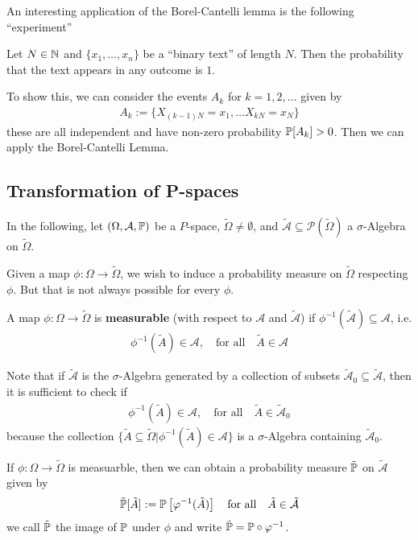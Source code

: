 An interesting application of the Borel-Cantelli lemma is the following ``experiment''
\begin{ex}[]
Let $N \in \mathbb{N}$ and $\{x_1,\ldots,x_n\}$ be a ``binary text'' of length $N$. Then the probability that the text appears in any outcome is $1$.

To show this, we can consider the events $A_k$ for $k = 1, 2, \ldots$ given by
\begin{align*}
  A_k := \{X_{(k-1)N} = x_1, \ldots X_{kN} = x_N\}
\end{align*}
these are all independent and have non-zero probability $\mathbb{P}[A_k] > 0$. 
Then we can apply the Borel-Cantelli Lemma.
\end{ex}

\subsection{Transformation of P-spaces}
In the following, let $(\Omega,\mathcal{A},\mathbb{P})$ be a $P$-space, $\tilde{\Omega} \neq \emptyset$, and $\tilde{\mathcal{A}} \subseteq \mathcal{P}(\tilde{\Omega})$ a $\sigma$-Algebra on $\tilde{\Omega}$.

Given a map $\phi: \Omega \to \tilde{\Omega}$, we wish to induce a probability measure on $\tilde{\Omega}$ respecting $\phi$. 
But that is not always possible for every $\phi$.
\begin{dfn}[]
  A map $\phi: \Omega \to \tilde{\Omega}$ is \textbf{measurable} (with respect to $\mathcal{A}$ and $\tilde{\mathcal{A}}$) if $\phi^{-1}(\tilde{\mathcal{A}}) \subseteq \mathcal{A}$, i.e.
  \begin{align*}
    \phi^{-1}(\tilde{A}) \in \mathcal{A}, \quad \text{for all} \quad \tilde{A} \in \mathcal{A}
  \end{align*}
\end{dfn}
Note that if $\tilde{\mathcal{A}}$ is the $\sigma$-Algebra generated by a collection of subsets $\tilde{\mathcal{A}}_0 \subseteq \tilde{\mathcal{A}}$, then it is sufficient to check if
\begin{align*}
  \phi^{-1}(\tilde{A}) \in \mathcal{A}, \quad \text{for all} \quad \tilde{A} \in \tilde{\mathcal{A}}_0
\end{align*}
because the collection $\{\tilde{A} \subseteq \tilde{\Omega} \big\vert \phi^{-1}(\tilde{A}) \in \mathcal{A}\}$ is a $\sigma$-Algebra containing $\tilde{\mathcal{A}}_0$.



\begin{prop}[]
If $\phi: \Omega \to \tilde{\Omega}$ is measuarble, then we can obtain a probability measure $\tilde{\mathbb{P}}$ on $\tilde{\mathcal{A}}$ given by
\begin{align*}
  \tilde{\mathbb{P}}[\tilde{A}] := \mathbb{P}\left[\varphi^{-1}(\tilde{A})\right] \quad \text{for all} \quad \tilde{A} \in \tilde{\mathcal{A}}
\end{align*}
we call $\tilde{\mathbb{P}}$ the image of $\mathbb{P}$ under $\phi$ and write $\tilde{\mathbb{P}} = \mathbb{P} \circ \varphi^{-1}$.
\end{prop}

